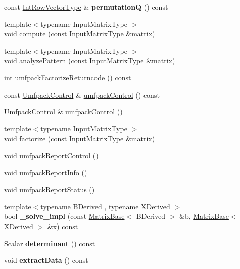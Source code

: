 \begin{DoxyCompactItemize}
const \mbox{\hyperlink{class_eigen_1_1_matrix}{Int\+Row\+Vector\+Type}} \& {\bfseries permutationQ} () const
\item 
{\footnotesize template$<$typename Input\+Matrix\+Type $>$ }\\void \mbox{\hyperlink{class_eigen_1_1_umf_pack_l_u_a05fb2b5717ebd67e46b83439721ceee7}{compute}} (const Input\+Matrix\+Type \&matrix)
\item 
{\footnotesize template$<$typename Input\+Matrix\+Type $>$ }\\void \mbox{\hyperlink{class_eigen_1_1_umf_pack_l_u_ac7ea28b2017d6b26b7b08497f294e5e6}{analyze\+Pattern}} (const Input\+Matrix\+Type \&matrix)
\item 
int \mbox{\hyperlink{class_eigen_1_1_umf_pack_l_u_a822fa9d82754269c379dc4ce17920b0a}{umfpack\+Factorize\+Returncode}} () const
\item 
const \mbox{\hyperlink{class_eigen_1_1_array}{Umfpack\+Control}} \& \mbox{\hyperlink{class_eigen_1_1_umf_pack_l_u_ae83d178202f3d44c1789c1c93842bf2e}{umfpack\+Control}} () const
\item 
\mbox{\hyperlink{class_eigen_1_1_array}{Umfpack\+Control}} \& \mbox{\hyperlink{class_eigen_1_1_umf_pack_l_u_a679bd267a0407d4ca985d97f0b864101}{umfpack\+Control}} ()
\item 
{\footnotesize template$<$typename Input\+Matrix\+Type $>$ }\\void \mbox{\hyperlink{class_eigen_1_1_umf_pack_l_u_a1471bf890503e743c45d75cc02a5345d}{factorize}} (const Input\+Matrix\+Type \&matrix)
\item 
void \mbox{\hyperlink{class_eigen_1_1_umf_pack_l_u_ac6ff58ef8eb8221e6af87de750d6619b}{umfpack\+Report\+Control}} ()
\item 
void \mbox{\hyperlink{class_eigen_1_1_umf_pack_l_u_afad062dfc49ca6d2d19d534b3f8f8d28}{umfpack\+Report\+Info}} ()
\item 
void \mbox{\hyperlink{class_eigen_1_1_umf_pack_l_u_a82497bbf75d995a6d4ae7e9191f79525}{umfpack\+Report\+Status}} ()
\item 
\mbox{\label{class_eigen_1_1_umf_pack_l_u_a83a5aa7038e4920b79fefff82f49f610}} 
{\footnotesize template$<$typename B\+Derived , typename X\+Derived $>$ }\\bool {\bfseries \+\_\+solve\+\_\+impl} (const \mbox{\hyperlink{class_eigen_1_1_matrix_base}{Matrix\+Base}}$<$ B\+Derived $>$ \&b, \mbox{\hyperlink{class_eigen_1_1_matrix_base}{Matrix\+Base}}$<$ X\+Derived $>$ \&x) const
\item 
\mbox{\label{class_eigen_1_1_umf_pack_l_u_a4a1635ee0ee23302df3c9ba24bc92f00}} 
Scalar {\bfseries determinant} () const
\item 
\mbox{\label{class_eigen_1_1_umf_pack_l_u_a782dbc0e1ee6cef571e11d6b70c822c1}} 
void {\bfseries extract\+Data} () const
\end{DoxyCompactItemize}
